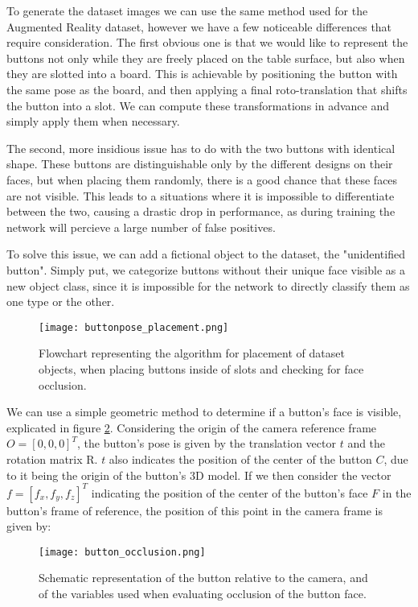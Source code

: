 To generate the dataset images we can use the same method used for the Augmented Reality dataset, however we have a few noticeable differences that require consideration. The first obvious one is that we would like to represent the buttons not only while they are freely placed on the table surface, but also when they are slotted into a board. This is achievable by positioning the button with the same pose as the board, and then applying a final roto-translation that shifts the button into a slot. We can compute these transformations in advance and simply apply them when necessary.

The second, more insidious issue has to do with the two buttons with identical shape. These buttons are distinguishable only by the different designs on their faces, but when placing them randomly, there is a good chance that these faces are not visible. This leads to a situations where it is impossible to differentiate between the two, causing a drastic drop in performance, as during training the network will percieve a large number of false positives.

To solve this issue, we can add a fictional object to the dataset, the "unidentified button". Simply put, we categorize buttons without their unique face visible as a new object class, since it is impossible for the network to directly classify them as one type or the other.

\begin{figure}[ht]
    \texttt{[image: buttonpose\_placement.png]}
    \caption{Flowchart representing the algorithm for placement of dataset objects, when placing buttons inside of slots and checking for face occlusion.}
    \label{fig:buttonpose_placement}
\end{figure}

We can use a simple geometric method to determine if a button's face is visible, explicated in figure \ref{fig:button_occlusion}. Considering the origin of the camera reference frame $O = [0, 0, 0]^T$, the button's pose is given by the translation vector $t$ and the rotation matrix R. $t$ also indicates the position of the center of the button $C$, due to it being the origin of the button's 3D model. If we then consider the vector $f = [f_x, f_y, f_z]^T$ indicating the position of the center of the button's face $F$ in the button's frame of reference, the position of this point in the camera frame is given by:

\begin{figure}
    \texttt{[image: button\_occlusion.png]}
    \caption{Schematic representation of the button relative to the camera, and of the variables used when evaluating occlusion of the button face.}
    \label{fig:button_occlusion}
\end{figure}

